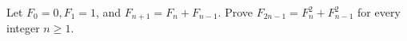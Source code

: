 Let $F_0=0,F_1=1$, and $F_{n+1}=F_n+F_{n-1}$. Prove $F_{2n-1}=F_n^2+F_{n-1}^2$ for every integer $n\ge1$.
